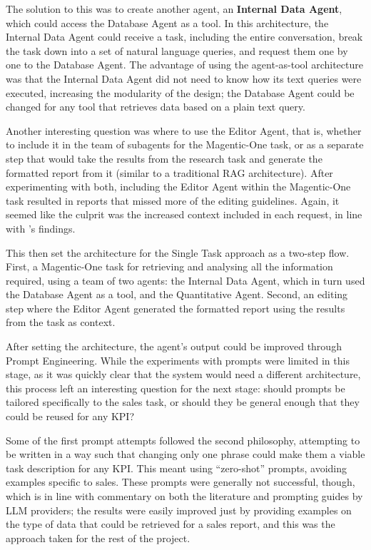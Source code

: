 \documentclass[a4paper]{report}
\begin{document}
The solution to this was to create another agent, an \textbf{Internal Data Agent}, which could access the Database Agent as a tool. In this architecture, the Internal Data Agent could receive a task, including the entire conversation, break the task down into a set of natural language queries, and request them one by one to the Database Agent. The advantage of using the agent-as-tool architecture was that the Internal Data Agent did not need to know how its text queries were executed, increasing the modularity of the design; the Database Agent could be changed for any tool that retrieves data based on a plain text query.

Another interesting question was where to use the Editor Agent, that is, whether to include it in the team of subagents for the Magentic-One task, or as a separate step that would take the results from the research task and generate the formatted report from it (similar to a traditional RAG architecture). After experimenting with both, including the Editor Agent within the Magentic-One task resulted in reports that missed more of the editing guidelines. Again, it seemed like the culprit was the increased context included in each request, in line with \cite{veseli2025positionalbiasesshiftinputs}'s findings.

This then set the architecture for the Single Task approach as a two-step flow. First, a Magentic-One task for retrieving and analysing all the information required, using a team of two agents: the Internal Data Agent, which in turn used the Database Agent as a tool, and the Quantitative Agent. Second, an editing step where the Editor Agent generated the formatted report using the results from the task as context.

After setting the architecture, the agent's output could be improved through Prompt Engineering. While the experiments with prompts were limited in this stage, as it was quickly clear that the system would need a different architecture, this process left an interesting question for the next stage: should prompts be tailored specifically to the sales task, or should they be general enough that they could be reused for any KPI?

Some of the first prompt attempts followed the second philosophy, attempting to be written in a way such that changing only one phrase could make them a viable task description for any KPI. This meant using ``zero-shot'' prompts, avoiding examples specific to sales. These prompts were generally not successful, though, which is in line with commentary on both the literature and prompting guides by LLM providers; the results were easily improved just by providing examples on the type of data that could be retrieved for a sales report, and this was the approach taken for the rest of the project.
\end{document}
